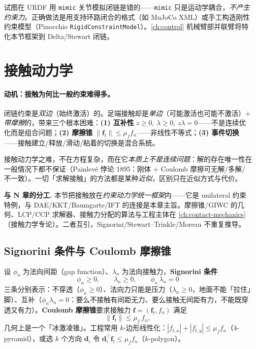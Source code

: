 \begin{pitfall}
试图在 URDF 用 \texttt{mimic} 关节模拟闭链是错的——\texttt{mimic} 只是运动学耦合，\emph{不产生约束力}。正确做法是用支持环路闭合的格式（如 MuJoCo XML）或手工构造刚性约束模型（Pinocchio \texttt{RigidConstraintModel}）。\cref{ch:control} 机械臂部并联臂将特化本节框架到 Delta/Stewart 闭链。
\end{pitfall}

\section{接触动力学}
\label{sec:cd-contact}

\paragraph{动机：接触为何比一般约束难得多。}
闭链约束是\emph{双边}（始终激活）的。足端接触却是\emph{单边}（可能激活也可能不激活）$+$\emph{带摩擦}的，带来三个根本困难：\textbf{(1) 互补性} $z\ge0,\ \lambda\ge0,\ z\lambda=0$——不是连续优化而是组合问题；\textbf{(2) 摩擦锥} $\|\mathbf f_t\|\le\mu_f f_n$——非线性不等式；\textbf{(3) 事件切换}——接触建立/释放/滑动/粘着的切换是混合系统。

\begin{insight}[接触本质上不是连续问题]
接触动力学之难，不在方程复杂，而在它\emph{本质上不是连续问题}：解的存在唯一性在一般情况下都不保证（Painlevé 悖论 1895\cite{painleve1895lois}：刚体 $+$ Coulomb 摩擦可无解/多解/不一致）。一切「求解接触」的方法都是某种\emph{近似}，区别只在近似方式与代价。
\end{insight}

\begin{note}
\textbf{与 N 章的分工.}\;
本节把接触放在\emph{约束动力学统一框架}内——它是 unilateral 约束特例，与 DAE/KKT/Baumgarte/IFT 的连接是本章主旨。摩擦锥/GIWC 的几何、LCP/CCP 求解器、接触力分配的算法与工程主体在 \cref{ch:contact-mechanics}（接触力学专论）。二者互引，Signorini/Stewart--Trinkle/Moreau 不重复推导。
\end{note}

\subsection{Signorini 条件与 Coulomb 摩擦锥}
设 $\phi_n$ 为法向间距（gap function）、$\lambda_n$ 为法向接触力，\textbf{Signorini 条件}
\begin{equation}
  \phi_n\ge0,\qquad \lambda_n\ge0,\qquad \phi_n\,\lambda_n=0
  \label{eq:cd-signorini}
\end{equation}
三条分别表示：不穿透（$\phi_n\ge0$）、法向力只能是压力（$\lambda_n\ge0$，地面不能「拉住」脚）、互补（$\phi_n\lambda_n=0$：要么不接触有间距无力、要么接触无间距有力，不能既穿透又有力）。\textbf{Coulomb 摩擦锥}要求接触力 $\mathbf f=(\mathbf f_t,f_n)$ 满足
\begin{equation}
  \|\mathbf f_t\|\le\mu_f\,f_n,
  \label{eq:cd-coulomb}
\end{equation}
几何上是一个「冰激凌锥」。工程常用 $k$-边形线性化：$|f_{t,x}|+|f_{t,y}|\le\mu_f f_n$（4-pyramid），或选 $k$ 个方向 $\mathbf d_i$ 令 $\mathbf d_i^\top\mathbf f_t\le\mu_f f_n$（$k$-polygon）。


